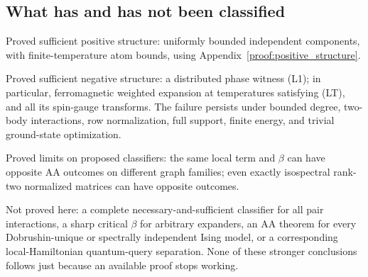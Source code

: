 \subsection{What has and has not been
classified}\label{proof:local_interactions:what-has-and-has-not-been-classified}

Proved sufficient positive structure: uniformly bounded independent
components, with finite-temperature atom bounds, using
Appendix~\ref{proof:positive_structure}.

Proved sufficient negative structure: a distributed phase witness (L1);
in particular, ferromagnetic weighted expansion at temperatures
satisfying (LT), and all its spin-gauge transforms. The failure persists
under bounded degree, two-body interactions, row normalization, full
support, finite energy, and trivial ground-state optimization.

Proved limits on proposed classifiers: the same local term and \(\beta\)
can have opposite AA outcomes on different graph families; even exactly
isospectral rank-two normalized matrices can have opposite outcomes.

Not proved here: a complete necessary-and-sufficient classifier for all
pair interactions, a sharp critical \(\beta\) for arbitrary expanders,
an AA theorem for every Dobrushin-unique or spectrally independent Ising
model, or a corresponding local-Hamiltonian quantum-query separation.
None of these stronger conclusions follows just because an available
proof stops working.
